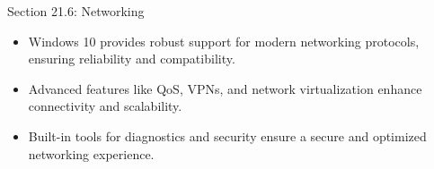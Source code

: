 \begin{notes}{Section 21.6: Networking}
    \begin{highlight}
        \begin{itemize}
            \item Windows 10 provides robust support for modern networking protocols, ensuring reliability and compatibility.
            \item Advanced features like QoS, VPNs, and network virtualization enhance connectivity and scalability.
            \item Built-in tools for diagnostics and security ensure a secure and optimized networking experience.
        \end{itemize}
    \end{highlight}
\end{notes}